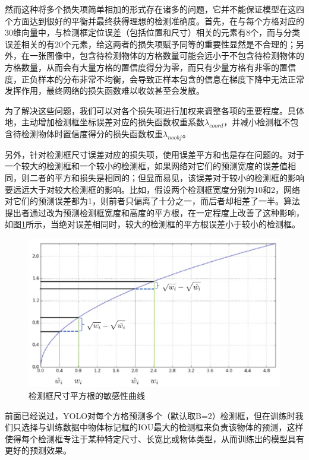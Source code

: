 然而这种将多个损失项简单相加的形式存在诸多的问题，它并不能保证模型在这四个方面达到很好的平衡并最终获得理想的检测准确度。首先，在与每个方格对应的30维向量中，与检测框定位误差（包括位置和尺寸）相关的元素有8个，而与分类误差相关的有20个元素，给这两者的损失项赋予同等的重要性显然是不合理的；另外，在一张图像中，包含待检测物体的方格数量可能会远小于不包含待检测物体的方格数量，从而会有大量方格的置信度得分为零，而只有少量方格有非零的置信度，正负样本的分布非常不均衡，会导致正样本包含的信息在梯度下降中无法正常发挥作用，最终网络的损失函数难以收敛甚至会发散。

为了解决这些问题，我们可以对各个损失项进行加权来调整各项的重要程度。具体地，主动增加检测框坐标误差对应的损失函数权重系数$\lambda_{coord}$，并减小检测框不包含待检测物体时置信度得分的损失函数权重$\lambda_{noobj}$。

另外，针对检测框尺寸误差对应的损失项，使用误差平方和也是存在问题的。对于一个较大的检测框和一个较小的检测框，如果网络对它们的预测宽度的误差值相同，则二者的平方和损失是相同的；但显而易见，该误差对于较小的检测框的影响要远远大于对较大检测框的影响。比如，假设两个检测框宽度分别为10和2，网络对它们的预测误差都为1，则前者只偏离了十分之一，而后者却相差了一半。算法提出者通过改为预测检测框宽度和高度的平方根，在一定程度上改善了这种影响，如图\ref{fig:3_2_检测框尺寸平方根的敏感性曲线}所示，当绝对误差相同时，较大的检测框的平方根误差小于较小的检测框。

\begin{figure}[htb] %
	\centering
	\includegraphics[width=5in]{figures/3_2_检测框尺寸平方根的敏感性曲线}
	\caption{检测框尺寸平方根的敏感性曲线} \label{fig:3_2_检测框尺寸平方根的敏感性曲线}
\end{figure}

前面已经说过，YOLO对每个方格预测多个（默认取B=2）检测框，但在训练时我们只选择与训练数据中物体标记框的IOU最大的检测框来负责该物体的预测，这样使得每个检测框专注于某种特定尺寸、长宽比或物体类型，从而训练出的模型具有更好的预测效果。

